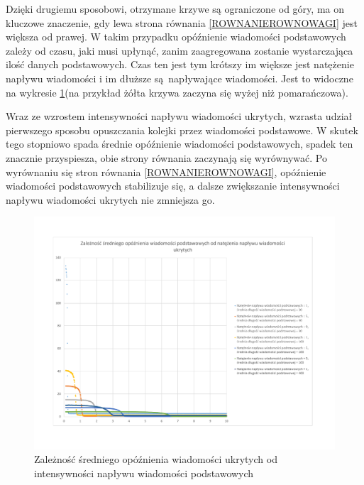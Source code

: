 \documentclass[a4paper, twoside, 12pt]{report}
\begin{document}
            Dzięki drugiemu sposobowi, otrzymane krzywe są ograniczone od góry,
            ma on kluczowe znaczenie, gdy lewa strona równania \ref{ROWNANIEROWNOWAGI} jest większa od prawej.
            W takim przypadku
            opóźnienie wiadomości podstawowych zależy od czasu, jaki musi upłynąć,
            zanim zaagregowana zostanie wystarczająca ilość danych podstawowych.
            Czas ten jest tym krótszy im większe jest natężenie napływu wiadomości
            i im dłuższe są napływające wiadomości. Jest to widoczne na wykresie
            \ref{OPOZNIENIEPODSTAWOWYCHODUKRYTYCH}(na przykład żółta krzywa zaczyna
            się wyżej niż pomarańczowa).

            Wraz ze wzrostem intensywności napływu wiadomości ukrytych, wzrasta udział
            pierwszego sposobu opuszczania kolejki przez wiadomości podstawowe.
            W skutek tego stopniowo spada średnie opóźnienie wiadomości podstawowych,
            spadek ten znacznie przyspiesza, obie strony równania zaczynają się wyrównywać.
            Po wyrównaniu się stron równania \ref{ROWNANIEROWNOWAGI},
            opóźnienie wiadomości podstawowych stabilizuje się, a dalsze zwiększanie
            intensywności napływu wiadomości ukrytych nie zmniejsza go.

        \begin{figure}[h]
                \centering
                \includegraphics[scale=0.6]{opoznieniepodstawowychodnatezeniaukrytych}
                \caption{Zależność średniego opóźnienia wiadomości ukrytych od
                    intensywności napływu wiadomości podstawowych}
                \label{OPOZNIENIEPODSTAWOWYCHODUKRYTYCH}
        \end{figure}
\end{document}
